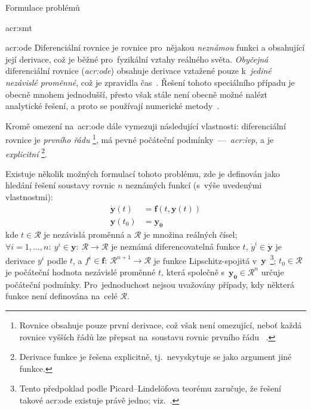 \documentclass[thesis=M,czech]{FITthesis}[2012/06/26]
\newcommand{\acrlabel}[1]{acr:#1}
\newcommand{\acr}[1]{\acrshort{\acrlabel{#1}}}
\newcommand{\acrf}[1]{\acrfull{\acrlabel{#1}}}
\newcommand{\hl}[1]{\textit{#1}}
\newcommand{\name}[1]{\hl{#1}}
\newcommand{\cit}[1]{\cite{#1}}
\renewcommand{\vec}[1]{\ensuremath{\boldsymbol{#1}}}
\newcommand{\set}[1]{\ensuremath{\mathcal{#1}}}
\newcommand{\der}[1]{\ensuremath{\dot{#1}}}
\begin{document}
\begin{section}{Formulace problémů}
\begin{subsection}{\acrf{smt}}

\end{subsection} %


\begin{subsection}{\acrf{ode}}\label{ss:theory:formulation:ode}
Diferenciální rovnice je rovnice pro~nějakou \hl{neznámou} funkci
a obsahující její derivace,
což je běžné pro~fyzikální vztahy reálného světa.
\hl{Obyčejná} diferenciální rovnice (\name{\acr{ode}})
obsahuje derivace vztažené pouze
k~\hl{jediné nezávislé proměnné},
což je zpravidla čas~\cit{ode}.
Řešení tohoto speciálního případu je obecně mnohem jednodušší,
přesto však stále není obecně možné nalézt analytické řešení,
a proto se používají numerické metody~\cit{odeint-art}.

Kromě omezení na~\acr{ode} dále vymezuji
následující vlastnosti:
diferenciální rovnice je \name{prvního řádu}%
\footnote{Rovnice obsahuje pouze první derivace,
což však není omezující,
neboť každá rovnice vyšších řádů
lze přepsat na~soustavu rovnic prvního řádu%
~\cit{ode-valid-runge_kutta-art}\cit{ode-lec}.},
má pevné počáteční podmínky~---~\name{\acrf{ivp}},
a je \name{explicitní}%
\footnote{Derivace funkce je řešena explicitně,
tj.~nevyskytuje se jako argument jiné funkce.}.

Existuje několik možných formulací tohoto problému,
zde je definován jako hledání řešení soustavy rovnic
$n$ neznámých funkcí
(s~výše uvedenými vlastnostmi):
\begin{equation}\label{eq:ode}
\begin{split}
   \vec{\der{y}}(t) &= \vec{f} \! \left( t, \vec{y}(t) \right) \\
   \vec{y}(t_0)     &= \vec{y_0}
\end{split}
\end{equation}
kde ${t \in \set{R}}$ je nezávislá proměnná a \set{R}
je množina reálných čísel;
${\forall i = 1,} \dots, n : \:
{y^i \in \vec{y}} : \: {\set{R} \rightarrow \set{R}}$
je neznámá diferencovatelná funkce $t$,
${\der{y}^i \in \vec{\der{y}}}$ je derivace $y^i$ podle $t$,
a ${f^i \in \vec{f}} : \: {\set{R}^{n+1} \rightarrow \set{R}}$
je funkce Lipschitz-spojitá v~\vec{y}\,%
\footnote{Tento předpoklad podle Picard--Lindelöfova teorému zaručuje,
že řešení takové \acr{ode} existuje právě jedno; viz.~\cit{ode-lec}.};
${t_0 \in \set{R}}$ je počáteční hodnota nezávislé proměnné $t$,
která společně s~${\vec{y_0} \in \set{R}^{n}}$ určuje počáteční podmínky.
Pro~jednoduchost nejsou uvažovány případy,
kdy některá funkce není definována na~celé \set{R}.


\end{subsection}
\end{section}
\end{document}
